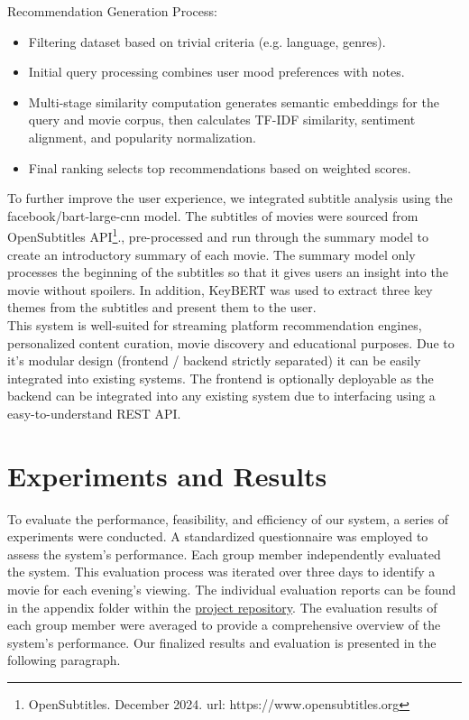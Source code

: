 \documentclass[12pt,a4paper]{article}
\begin{document}
\noindent Recommendation Generation Process:
\begin{itemize}
  \item Filtering dataset based on trivial criteria (e.g. language, genres).
  \item Initial query processing combines user mood preferences with notes.
  \item Multi-stage similarity computation generates semantic embeddings for the query and movie corpus, then calculates TF-IDF similarity, sentiment alignment, and popularity normalization.
  \item Final ranking selects top recommendations based on weighted scores.
\end{itemize}

\noindent To further improve the user experience, we integrated subtitle analysis using the facebook/bart-large-cnn model. 
The subtitles of movies were sourced from OpenSubtitles API\footnote{\label{OpenSubtitles}OpenSubtitles. December 2024. url: https://www.opensubtitles.org}., pre-processed and run through the summary model to create an introductory summary of each movie. 
The summary model only processes the beginning of the subtitles so that it gives users an insight into the movie without spoilers. 
In addition, KeyBERT was used to extract three key themes from the subtitles and present them to the user. 
\newline \\
\noindent This system is well-suited for streaming platform recommendation engines, personalized content curation, movie discovery and educational purposes.
Due to it's modular design (frontend / backend strictly separated) it can be easily integrated into existing systems.
The frontend is optionally deployable as the backend can be integrated into any existing system due to interfacing
using a easy-to-understand REST API.

\section{Experiments and Results}

To evaluate the performance, feasibility, and efficiency of our system, a series of experiments were conducted.
A standardized questionnaire was employed to assess the system’s performance.
Each group member independently evaluated the system.
This evaluation process was iterated over three days to identify a movie for each evening’s viewing.
The individual evaluation reports can be found in the appendix folder within the
\href{https://github.com/IImpaq/air-2024/appendix}{project repository}.
The evaluation results of each group member were averaged to provide a comprehensive overview of the system’s performance.
Our finalized results and evaluation is presented in the following paragraph.
\end{document}
